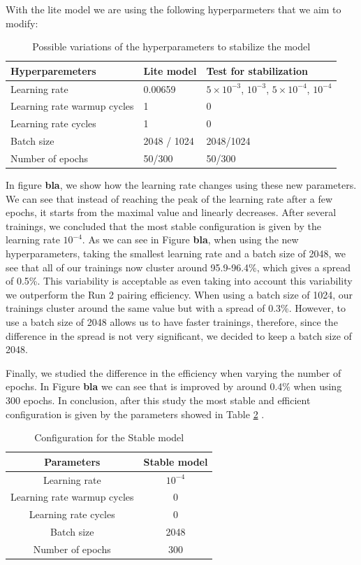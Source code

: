 With the lite model we are using the following hyperparmeters that we aim to modify:

\begin{table}[hbt]
\centering
\begin{tabular}{|p{5cm}|p{4cm}|p{5cm}|}
 \hline
 Hyperparemeters  & Lite model & Test for stabilization \\
 \hline
 Learning rate & 0.00659 & $5\times 10^{-3}$, $10^{-3}$, $5\times 10^{-4}$, $10^{-4}$ \\
 \hline
 Learning rate warmup cycles & 1 & 0\\
 \hline
  Learning rate cycles & 1 & 0\\
 \hline
 Batch size & 2048 / 1024 & 2048/1024 \\
 \hline
 Number of epochs & 50/300 & 50/300 \\
 \hline
\end{tabular}
\caption{Possible variations of the hyperparameters to stabilize the model}
\label{table: }
\end{table}

In figure \textbf{bla}, we show how the learning rate changes using these new parameters. We can see that instead of reaching the peak of the learning rate after a few epochs, it starts from the maximal value and linearly decreases. After several trainings, we concluded that the most stable configuration is given by the learning rate $10^{-4}$. As we can see in Figure \textbf{bla}, when using the new hyperparameters, taking the smallest learning rate and a batch size of 2048, we see that all of our trainings now cluster around 95.9-96.4\%, which gives a spread of 0.5\%. This variability is acceptable as even taking into account this variability we outperform the Run 2 pairing efficiency. When using a batch size of 1024, our trainings cluster around the same value but with a spread of 0.3\%. However, to use a batch size of 2048 allows us to have faster trainings, therefore, since the difference in the spread is not very significant, we decided to keep a batch size of 2048. 


Finally, we studied the difference in the efficiency when varying the number of epochs. In Figure \textbf{bla} we can see that is improved by around 0.4\% when using 300 epochs. In conclusion, after this study the most stable and efficient configuration is given by the parameters showed in Table \ref{table: stable model} .

\begin{table}[hbt]
\centering
\begin{tabular}{|c|c|}
 \hline
 Parameters  & Stable model  \\
 \hline
 Learning rate &  $10^{-4}$ \\
 \hline
 Learning rate warmup cycles &  0\\
 \hline
  Learning rate cycles & 0\\
 \hline
 Batch size & 2048 \\
 \hline
 Number of epochs & 300 \\
 \hline
\end{tabular}
\caption{Configuration for the Stable model}
\label{table: stable model}
\end{table}


